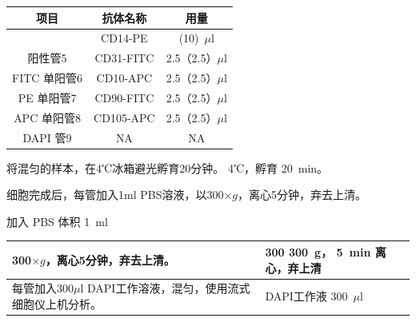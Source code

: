 \documentclass[UTF8,10pt,a4paper,fontset=fandol]{ctexart}
\newcommand{\fieldvalue}[1]{#1}
\newcommand{\handwritten}[1]{#1}
\begin{document}
\begin{tabularx}{\textwidth}{|c|c|c|}
\hline
\textbf{项目} & \textbf{抗体名称} & \textbf{用量} \\
\hline
 & CD14-PE & (10)~$\mu$l \\
\hline
阳性管5 & CD31-FITC &
\fieldvalue{\handwritten{2.5}}（2.5）$\mu$l \\
\hline
FITC 单阳管6 & CD10-APC &
\fieldvalue{\handwritten{2.5}}（2.5）$\mu$l \\
\hline
PE 单阳管7 & CD90-FITC &
\fieldvalue{\handwritten{2.5}}（2.5）$\mu$l \\
\hline
APC 单阳管8 & CD105-APC &
\fieldvalue{\handwritten{2.5}}（2.5）$\mu$l \\
\hline
DAPI 管9 & NA & NA \\
\hline
\end{tabularx}

\vspace{2mm}

将混匀的样本，在4℃冰箱避光孵育20分钟。
\fieldvalue{\handwritten{4}}℃，孵育
\fieldvalue{\handwritten{20}}~min。

\noindent
细胞完成后，每管加入1ml PBS溶液，以300$\times g$，离心5分钟，弃去上清。
\begin{flushright}
加入 PBS 体积
\fieldvalue{\handwritten{1}}~ml
\end{flushright}

\noindent
\begin{tabularx}{\textwidth}{|X|X|}
\hline
300$\times g$，离心5分钟，弃去上清。 &
300
\fieldvalue{\handwritten{300}}~g，
\fieldvalue{\handwritten{5}}~min 离心，\fieldvalue{\handwritten{弃上清}} \\
\hline
每管加入300$\mu$l DAPI工作溶液，混匀，使用流式细胞仪上机分析。 &
DAPI工作液
\fieldvalue{\handwritten{300}}~$\mu$l \\
\hline
\end{tabularx}
\end{document}
